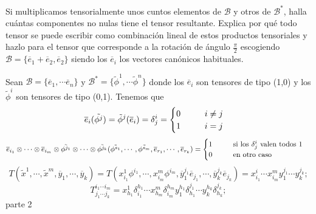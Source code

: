 \begin{problem}[4] \ppart Si multiplicamos tensorialmente unos cuntos elementos de $\mathcal{B}$ y otros de $\mathcal{B}^*$, halla cuántas componentes no nulas tiene el tensor resultante. Explica por qué todo tensor se puede escribir como combinación lineal de estos productos tensoriales y \ppart hazlo para el tensor que corresponde a la rotación de ángulo $\frac{\pi}{2}$ escogiendo $\mathcal{B}=\{\overline{e}_1+\overline{e}_2,\overline{e}_2\}$ siendo los $\overline{e}_i$ los vectores canónicos habituales.
	
	\solution \spart Sean $\mathcal{B}=\{\overline{e}_1,\cdots\overline{e}_n\}$ y $\mathcal{B}^*=\{\tilde{\phi}^1,\cdots\tilde{\phi}^n\}$ donde los $\overline{e}_i$ son tensores de tipo (1,0) y los $\tilde{\phi}^i$ son tensores de tipo (0,1). Tenemos que $$\overline{e}_i(\tilde{\phi^{j}})=\tilde{\phi}^j(\overline{e}_i)=\delta^i_j=\begin{cases}0\hspace*{1cm} i\neq j\\1\hspace*{1cm} i=j
	\end{cases}$$
	$$\overline{e}_{i_1}\otimes\cdots\otimes\overline{e}_{i_m}\otimes\tilde{\phi^{j_1}}\otimes\cdots\otimes\tilde{\phi^{j_k}}(\tilde{\phi^{s_1}},\cdots,\tilde{\phi^{s_m}},\overline{e}_{r_1},\cdots,\overline{e}_{r_k})=\begin{cases}1\hspace*{1cm} \text{si los }\delta^i_j\text{ valen todos 1}\\0\hspace*{1cm} \text{en otro caso}
	\end{cases}$$
	$$T(\tilde{x}^1,\cdots,\tilde{x}^m,\overline{y}_1,\cdots,\overline{y}_k)=T(x^1_{i_1}\phi^{i_1},\cdots,x^m_{i_m}\phi^{i_m},\overline{y}_1^{j_1}\overline{e}_{j_1},\cdots,\overline{y}_k^{j_k}\overline{e}_{j_k})=x^i_{i_1}\cdots x^m_{i_m}y_1^{j_1}\cdots y_k^{j_k};$$
	$$T^{i_1\cdots i_m}_{j_1\cdots j_k}=x^1_{h_1}\delta^{h_1}_{i_1}\cdots x^m_{h_m}\delta^{h_m}_{i_m}y_1^{h_1}\delta^{j_1}_{h_1}\cdots y_k^{h_k}\delta^{j_k}_{h_k};$$
	\spart parte 2
\end{problem}
